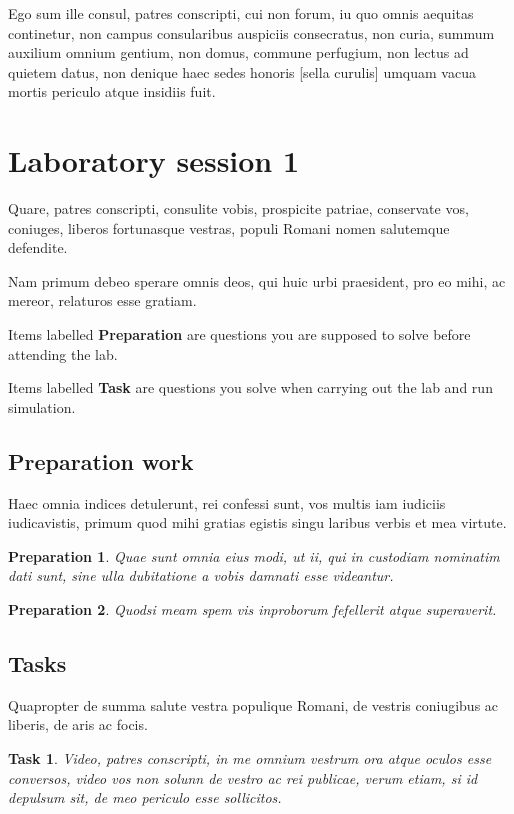 \documentclass[12pt, a4paper, twoside, english]{article}
\newcounter{prep}[section]
\newcounter{task}[section]
\newcounter{labnumber}
\newtheorem{prep}{Preparation}
\newtheorem{task}{Task}
\begin{document}
	Ego sum ille consul, patres
	conscripti, cui non forum, iu quo omnis aequitas continetur, non campus
	consularibus auspiciis consecratus, non curia, summum auxilium  omnium
	gentium, non domus, commune perfugium, non lectus ad quietem datus, non
	denique haec sedes honoris [sella curulis] umquam vacua mortis periculo
	atque insidiis fuit. 
	
	\newpage 
	\section{Laboratory session 1}
	\setcounter{labnumber}{1}
	Quare, patres conscripti, consulite vobis, prospicite patriae,
	conservate vos, coniuges, liberos fortunasque vestras, populi Romani
	nomen salutemque defendite. 
	
	 Nam primum debeo sperare omnis deos, qui huic urbi praesident, pro eo mihi,
	ac mereor, relaturos esse gratiam.
		
	Items labelled \textbf{Preparation} are questions you are supposed to solve before attending the lab.
	
	Items labelled \textbf{Task} are questions you solve when carrying out the lab and run simulation.
	
	\subsection{Preparation work}
	\label{sec:prep1}
	Haec omnia indices detulerunt, rei confessi sunt, vos multis iam iudiciis iudicavistis, primum quod mihi gratias egistis singu laribus verbis et mea virtute.
	
	\begin{prep} 
		Quae sunt omnia eius modi, ut ii, qui in custodiam nominatim dati sunt, sine ulla dubitatione a vobis damnati esse videantur.
	\end{prep} 
	
	\begin{prep} 
	   Quodsi meam spem vis inproborum fefellerit atque superaverit.
	\end{prep}
	
	\subsection{Tasks}
	Quapropter de summa salute vestra populique Romani, de vestris coniugibus ac liberis, de aris ac focis.
	

	\begin{task}
		Video, patres conscripti, in me omnium vestrum ora atque oculos esse conversos, video vos non solunn de vestro ac rei publicae, verum etiam, si id depulsum sit, de meo periculo esse sollicitos. 
	\end{task}
	
\end{document}
